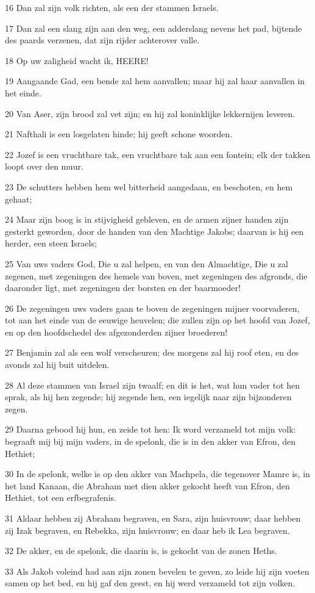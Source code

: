 \par 16 Dan zal zijn volk richten, als een der stammen Israels.
\par 17 Dan zal een slang zijn aan den weg, een adderslang nevens het pad, bijtende des paards verzenen, dat zijn rijder achterover valle.
\par 18 Op uw zaligheid wacht ik, HEERE!
\par 19 Aangaande Gad, een bende zal hem aanvallen; maar hij zal haar aanvallen in het einde.
\par 20 Van Aser, zijn brood zal vet zijn; en hij zal koninklijke lekkernijen leveren.
\par 21 Nafthali is een losgelaten hinde; hij geeft schone woorden.
\par 22 Jozef is een vruchtbare tak, een vruchtbare tak aan een fontein; elk der takken loopt over den muur.
\par 23 De schutters hebben hem wel bitterheid aangedaan, en beschoten, en hem gehaat;
\par 24 Maar zijn boog is in stijvigheid gebleven, en de armen zijner handen zijn gesterkt geworden, door de handen van den Machtige Jakobs; daarvan is hij een herder, een steen Israels;
\par 25 Van uws vaders God, Die u zal helpen, en van den Almachtige, Die u zal zegenen, met zegeningen des hemels van boven, met zegeningen des afgronds, die daaronder ligt, met zegeningen der borsten en der baarmoeder!
\par 26 De zegeningen uws vaders gaan te boven de zegeningen mijner voorvaderen, tot aan het einde van de eeuwige heuvelen; die zullen zijn op het hoofd van Jozef, en op den hoofdschedel des afgezonderden zijner broederen!
\par 27 Benjamin zal als een wolf verscheuren; des morgens zal hij roof eten, en des avonds zal hij buit uitdelen.
\par 28 Al deze stammen van Israel zijn twaalf; en dit is het, wat hun vader tot hen sprak, als hij hen zegende; hij zegende hen, een iegelijk naar zijn bijzonderen zegen.
\par 29 Daarna gebood hij hun, en zeide tot hen: Ik word verzameld tot mijn volk: begraaft mij bij mijn vaders, in de spelonk, die is in den akker van Efron, den Hethiet;
\par 30 In de spelonk, welke is op den akker van Machpela, die tegenover Mamre is, in het land Kanaan, die Abraham met dien akker gekocht heeft van Efron, den Hethiet, tot een erfbegrafenis.
\par 31 Aldaar hebben zij Abraham begraven, en Sara, zijn huisvrouw; daar hebben zij Izak begraven, en Rebekka, zijn huisvrouw; en daar heb ik Lea begraven.
\par 32 De akker, en de spelonk, die daarin is, is gekocht van de zonen Heths.
\par 33 Als Jakob voleind had aan zijn zonen bevelen te geven, zo leide hij zijn voeten samen op het bed, en hij gaf den geest, en hij werd verzameld tot zijn volken.

